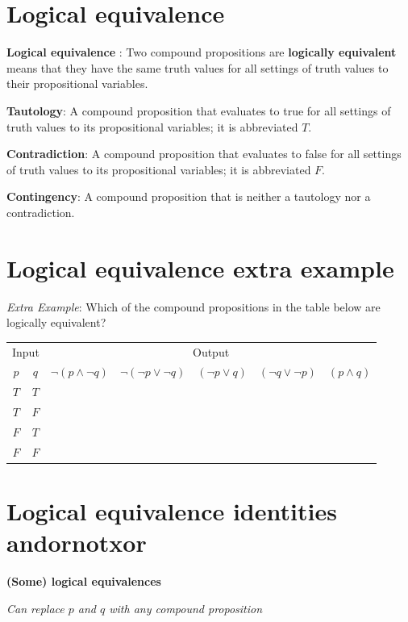\documentclass[12pt, oneside]{article}
\begin{document}
\section*{Logical equivalence}


{\bf Logical equivalence }: Two compound  propositions are {\bf logically  equivalent} means that  they 
have the  same  truth  values for all settings of truth  values to their propositional  variables.

{\bf Tautology}:  A compound proposition that evaluates to true
for all settings of truth  values to its propositional  variables; it is  abbreviated $T$.

{\bf Contradiction}: A compound proposition that  evaluates  to  false 
for  all settings of truth  values to its propositional  variables; it  is abbreviated $F$.

{\bf Contingency}: A compound proposition that is neither a tautology nor a contradiction.
 \vfill
\section*{Logical equivalence extra example}


{\it Extra Example}: Which of the  compound propositions in the table below are logically equivalent?
\begin{center}
\begin{tabular}{cc||c|c|c|c|c}
\multicolumn{2}{c||}{Input}  & \multicolumn{5}{c}{Output} \\
$p$ & $q$ & $\lnot (p \land \lnot q)$ & $\lnot (\lnot p  \lor \lnot q)$ &  $(\lnot p \lor  q)$
& $(\lnot q \lor \lnot p)$ & $(p \land q)$  \\
\hline
$T$ & $T$ & &&&&\\
$T$ & $F$ & &&&&\\
$F$ & $T$ & &&&&\\
$F$ & $F$ & &&&&\\
\end{tabular}
\end{center} \vfill
\section*{Logical equivalence identities andornotxor}


{\bf (Some) logical equivalences}

{\it Can replace $p$ and $q$ with any compound proposition}
\end{document}

